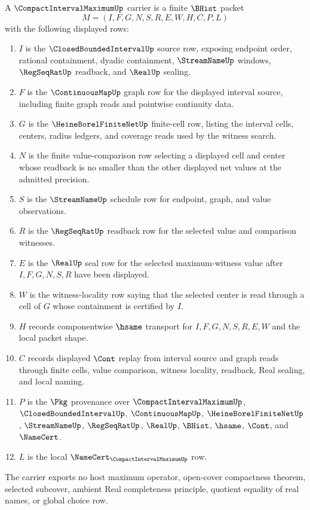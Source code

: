 \begin{definition}
\label{def:compact-interval-maximum-carrier}
A $\CompactIntervalMaximumUp$ carrier is a finite $\BHist$ packet
$$
M=(I,F,G,N,S,R,E,W,H,C,P,L)
$$
with the following displayed rows:
\begin{enumerate}
\item $I$ is the $\ClosedBoundedIntervalUp$ source row, exposing endpoint order, rational containment, dyadic containment, $\StreamNameUp$ windows, $\RegSeqRatUp$ readback, and $\RealUp$ sealing.
\item $F$ is the $\ContinuousMapUp$ graph row for the displayed interval source, including finite graph reads and pointwise continuity data.
\item $G$ is the $\HeineBorelFiniteNetUp$ finite-cell row, listing the interval cells, centers, radius ledgers, and coverage reads used by the witness search.
\item $N$ is the finite value-comparison row selecting a displayed cell and center whose readback is no smaller than the other displayed net values at the admitted precision.
\item $S$ is the $\StreamNameUp$ schedule row for endpoint, graph, and value observations.
\item $R$ is the $\RegSeqRatUp$ readback row for the selected value and comparison witnesses.
\item $E$ is the $\RealUp$ seal row for the selected maximum-witness value after $I,F,G,N,S,R$ have been displayed.
\item $W$ is the witness-locality row saying that the selected center is read through a cell of $G$ whose containment is certified by $I$.
\item $H$ records componentwise $\hsame$ transport for $I,F,G,N,S,R,E,W$ and the local packet shape.
\item $C$ records displayed $\Cont$ replay from interval source and graph reads through finite cells, value comparison, witness locality, readback, Real sealing, and local naming.
\item $P$ is the $\Pkg$ provenance over $\CompactIntervalMaximumUp$, $\ClosedBoundedIntervalUp$, $\ContinuousMapUp$, $\HeineBorelFiniteNetUp$, $\StreamNameUp$, $\RegSeqRatUp$, $\RealUp$, $\BHist$, $\hsame$, $\Cont$, and $\NameCert$.
\item $L$ is the local $\NameCert_{\CompactIntervalMaximumUp}$ row.
\end{enumerate}
The carrier exports no host maximum operator, open-cover compactness theorem, selected subcover, ambient Real completeness principle, quotient equality of real names, or global choice row.
\end{definition}

